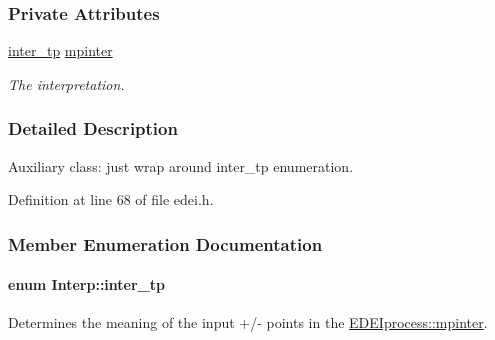 \subsubsection*{Private Attributes}
\begin{DoxyCompactItemize}
\item 
\hyperlink{classInterp_a48f7a943f951c25a9717d1849cf7cd87}{inter\_\-tp} \hyperlink{classInterp_af2350a967b89741ad75e3c8725d32a56}{mpinter}
\begin{DoxyCompactList}\small\item\em The interpretation. \item\end{DoxyCompactList}\end{DoxyCompactItemize}


\subsubsection{Detailed Description}
Auxiliary class: just wrap around inter\_\-tp enumeration. 

Definition at line 68 of file edei.h.



\subsubsection{Member Enumeration Documentation}
\hypertarget{classInterp_a48f7a943f951c25a9717d1849cf7cd87}{
\paragraph[{inter\_\-tp}]{\setlength{\rightskip}{0pt plus 5cm}enum {\bf Interp::inter\_\-tp}}\hfill}
\label{classInterp_a48f7a943f951c25a9717d1849cf7cd87}


Determines the meaning of the input +/-\/ points in the \hyperlink{classEDEIprocess_a1de13d8e88dc94c8627098298bc87667}{EDEIprocess::mpinter}. 

